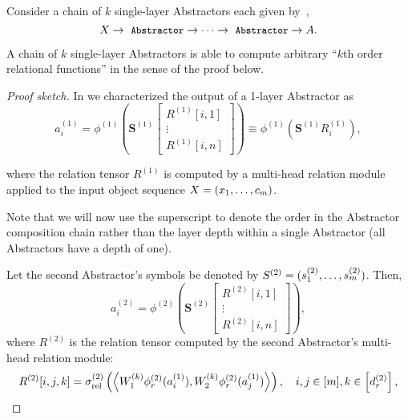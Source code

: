 \begin{lemma}\label{lemma:function_class_composed_abstractors}
	\hphantom{~}

	Consider a chain of \(k\) single-layer Abstractors each given by~,
	\[\bm{X} \to \module{Abstractor} \to \cdots \to \module{Abstractor} \to \bm{A}.\]

	A chain of \(k\) single-layer  Abstractors is able to compute arbitrary ``\(k\)th order relational functions'' in the sense of the proof below.
\end{lemma}
\begin{proof}[Proof sketch]
	In  we characterized the output of a 1-layer Abstractor as
	\begin{equation*}
		a_i^{(1)} = \phi^{(1)}\left(\bm{S}^{(1)} \begin{bmatrix}R^{(1)}[i,1] \\ \vdots \\ R^{(1)}[i,n]\end{bmatrix}\right) \equiv \phi^{(1)}\left( \bm{S}^{(1)} R_i^{(1)}\right),
	\end{equation*}

	where the relation tensor $R^{(1)}$ is computed by a multi-head relation module applied to the input object sequence $X = (x_1, \ldots, c_m)$.

	Note that we will now use the superscript to denote the order in the Abstractor composition chain rather than the layer depth within a single Abstractor (all  Abstractors have a depth of one).

	Let the second Abstractor's symbols be denoted by \(S^{(2)} = (s_1^{(2)}, \ldots, s_m^{(2)})\). Then,
	\begin{equation*}
		a_i^{(2)} = \phi^{(2)}\left(\bm{S}^{(2)} \begin{bmatrix}R^{(2)}[i,1] \\ \vdots \\ R^{(2)}[i,n]\end{bmatrix}\right),
	\end{equation*}
	where $R^{(2)}$ is the relation tensor computed by the second Abstractor's multi-head relation module:
	\begin{equation*}
		R^{(2)}[i, j, k] = \sigma_{\mathrm{rel}}^{(2)}\left(\left\langle W_1^{(k)} \phi_r^{(2)}(a_i^{(1)}), W_2^{(k)} \phi_r^{(2)}(a_j^{(1)}) \right\rangle\right), \quad i,j \in [m], k \in \left[d_r^{(2)}\right],
	\end{equation*}


\end{proof}
